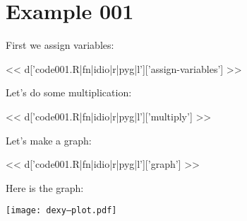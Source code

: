 \section{Example 001}

First we assign variables:

<< d['code001.R|fn|idio|r|pyg|l']['assign-variables'] >>

Let's do some multiplication:

<< d['code001.R|fn|idio|r|pyg|l']['multiply'] >>

Let's make a graph:

<< d['code001.R|fn|idio|r|pyg|l']['graph'] >>

Here is the graph:

\texttt{[image: dexy--plot.pdf]}

